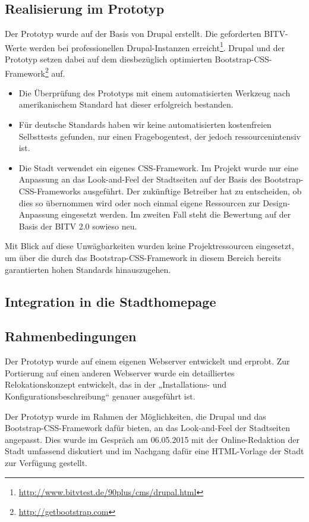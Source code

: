 \documentclass[11pt,a4paper,twoside]{article}
\begin{document}
\subsection*{Realisierung im Prototyp}

Der Prototyp wurde auf der Basis von Drupal erstellt.  Die geforderten
BITV-Werte werden bei professionellen Drupal-Instanzen
erreicht\footnote{\url{http://www.bitvtest.de/90plus/cms/drupal.html}}.
Drupal und der Prototyp setzen dabei auf dem diesbezüglich optimierten
Bootstrap-CSS-Framework\footnote{\url{http://getbootstrap.com}} auf.

\begin{itemize}\itemsep0pt
\item Die Überprüfung des Prototyps mit einem automatisierten Werkzeug nach
  amerikanischem Standard hat dieser erfolgreich bestanden.
\item Für deutsche Standards haben wir keine automatisierten kostenfreien
  Selbsttests gefunden, nur einen Fragebogentest, der jedoch
  ressourcenintensiv ist.
\item Die Stadt verwendet ein eigenes CSS-Framework. Im Projekt wurde nur eine
  Anpassung an das Look-and-Feel der Stadtseiten auf der Basis des
  Bootstrap-CSS-Frameworks ausgeführt.  Der zukünftige Betreiber hat zu
  entscheiden, ob dies so übernommen wird oder noch einmal eigene Ressourcen
  zur Design-Anpassung eingesetzt werden.  Im zweiten Fall steht die Bewertung
  auf der Basis der BITV 2.0 sowieso neu.
\end{itemize}
Mit Blick auf diese Unwägbarkeiten wurden keine Projektressourcen eingesetzt,
um über die durch das Bootstrap-CSS-Framework in diesem Bereich bereits
garantierten hohen Standards hinauszugehen.

\subsection{Integration in die Stadthomepage}

\subsection*{Rahmenbedingungen}

Der Prototyp wurde auf einem eigenen Webserver entwickelt und erprobt.  Zur
Portierung auf einen anderen Webserver wurde ein detailliertes
Relokationskonzept entwickelt, das in der „Installations- und
Konfigurationsbeschreibung“ genauer ausgeführt ist. 

Der Prototyp wurde im Rahmen der Möglichkeiten, die Drupal und das
Bootstrap-CSS-Framework dafür bieten, an das Look-and-Feel der Stadtseiten
angepasst. Dies wurde im Gespräch am 06.05.2015 mit der Online-Redaktion der
Stadt umfassend diskutiert und im Nachgang dafür eine HTML-Vorlage der Stadt
zur Verfügung gestellt.
\end{document}
